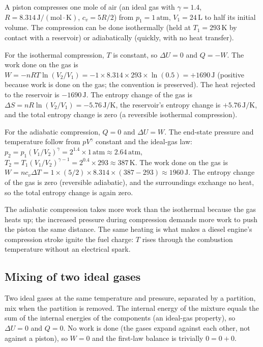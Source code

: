 A piston compresses one mole of air (an ideal gas with $\gamma = 1.4$,
$R = 8.314\,\text{J}/(\text{mol}\cdot\text{K})$, $c_v = 5R/2$) from
$p_1 = 1\,\text{atm}$, $V_1 = 24\,\si{\liter}$ to half its initial
volume. The compression can be done isothermally (held at $T_1 =
293\,\si{\kelvin}$ by contact with a reservoir) or adiabatically
(quickly, with no heat transfer).

For the isothermal compression, $T$ is constant, so $\Delta U = 0$ and
$Q = -W$. The work done on the gas is $W = -nRT \ln(V_2/V_1) = -1
\times 8.314 \times 293 \times \ln(0.5) = +1690\,\text{J}$ (positive
because work is done on the gas; the convention is preserved). The
heat rejected to the reservoir is $-1690\,\text{J}$. The entropy
change of the gas is $\Delta S = nR \ln(V_2/V_1) = -5.76\,\text{J}/
\text{K}$, the reservoir's entropy change is $+5.76\,\text{J}/\text{K}$,
and the total entropy change is zero (a reversible isothermal
compression).

For the adiabatic compression, $Q = 0$ and $\Delta U = W$. The
end-state pressure and temperature follow from $pV^\gamma$ constant
and the ideal-gas law: $p_2 = p_1 (V_1/V_2)^\gamma = 2^{1.4} \times
1\,\text{atm} \approx 2.64\,\text{atm}$, $T_2 = T_1
(V_1/V_2)^{\gamma-1} = 2^{0.4} \times 293 \approx 387\,\si{\kelvin}$.
The work done on the gas is $W = n c_v \Delta T = 1 \times (5/2)
\times 8.314 \times (387 - 293) \approx 1960\,\text{J}$. The entropy
change of the gas is zero (reversible adiabatic), and the surroundings
exchange no heat, so the total entropy change is again zero.

The adiabatic compression takes more work than the isothermal because
the gas heats up; the increased pressure during compression demands
more work to push the piston the same distance. The same heating is
what makes a diesel engine's compression stroke ignite the fuel
charge: $T$ rises through the combustion temperature without an
electrical spark.

\subsection{Mixing of two ideal gases}

Two ideal gases at the same temperature and pressure, separated by a
partition, mix when the partition is removed. The internal energy of
the mixture equals the sum of the internal energies of the components
(an ideal-gas property), so $\Delta U = 0$ and $Q = 0$. No work is done
(the gases expand against each other, not against a piston), so $W =
0$ and the first-law balance is trivially $0 = 0 + 0$.

